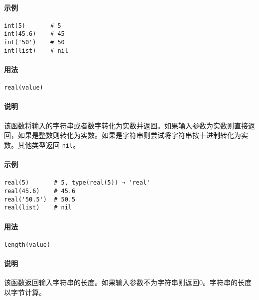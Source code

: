 \paragraph{示例}
\begin{lstlisting}[language=berry, numbers=none]
int(5)       # 5
int(45.6)    # 45
int('50')    # 50
int(list)    # nil
\end{lstlisting}


\paragraph{用法}
\begin{lstlisting}[language=berry, numbers=none]
real(value)
\end{lstlisting}

\paragraph{说明}
该函数将输入的字符串或者数字转化为实数并返回。如果输入参数为实数则直接返回，如果是整数则转化为实数。如果是字符串则尝试将字符串按十进制转化为实数。其他类型返回 \texttt{nil}。

\paragraph{示例}
\begin{lstlisting}[language=berry, numbers=none]
real(5)       # 5, type(real(5)) → 'real'
real(45.6)    # 45.6
real('50.5')  # 50.5
real(list)    # nil
\end{lstlisting}


\paragraph{用法}
\begin{lstlisting}[language=berry, numbers=none]
length(value)
\end{lstlisting}

\paragraph{说明}
该函数返回输入字符串的长度。如果输入参数不为字符串则返回0。字符串的长度以字节计算。


